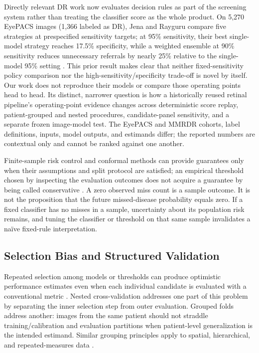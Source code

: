\documentclass{ieeeaccess}
\begin{document}
Directly relevant DR work now evaluates decision rules as part of the screening system rather than treating the classifier score as the whole product. On 5,270 EyePACS images (1,366 labeled as DR), Jena and Rayguru compare five strategies at prespecified sensitivity targets; at 95\% sensitivity, their best single-model strategy reaches 17.5\% specificity, while a weighted ensemble at 90\% sensitivity reduces unnecessary referrals by nearly 25\% relative to the single-model 95\% setting \cite{jena2026}. This prior result makes clear that neither fixed-sensitivity policy comparison nor the high-sensitivity/specificity trade-off is novel by itself. Our work does not reproduce their models or compare those operating points head to head. Its distinct, narrower question is how a historically reused retinal pipeline's operating-point evidence changes across deterministic score replay, patient-grouped and nested procedures, candidate-panel sensitivity, and a separate frozen image-model test. The EyePACS and MMRDR cohorts, label definitions, inputs, model outputs, and estimands differ; the reported numbers are contextual only and cannot be ranked against one another.

Finite-sample risk control and conformal methods can provide guarantees only when their assumptions and split protocol are satisfied; an empirical threshold chosen by inspecting the evaluation outcomes does not acquire a guarantee by being called conservative \cite{vovk2005,angelopoulos2021,angelopoulos2024}. A zero observed miss count is a sample outcome. It is not the proposition that the future missed-disease probability equals zero. If a fixed classifier has no misses in a sample, uncertainty about its population risk remains, and tuning the classifier or threshold on that same sample invalidates a naïve fixed-rule interpretation.

\subsection{Selection Bias and Structured Validation}
Repeated selection among models or thresholds can produce optimistic performance estimates even when each individual candidate is evaluated with a conventional metric \cite{cawley2010,varma2006}. Nested cross-validation addresses one part of this problem by separating the inner selection step from outer evaluation. Grouped folds address another: images from the same patient should not straddle training/calibration and evaluation partitions when patient-level generalization is the intended estimand. Similar grouping principles apply to spatial, hierarchical, and repeated-measures data \cite{roberts2017}.
\end{document}
